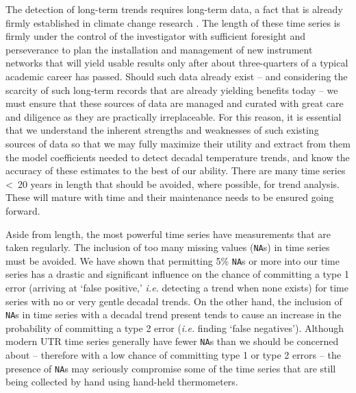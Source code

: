\documentclass[]{ametsoc}
\begin{document}
The detection of long-term trends requires long-term data, a fact that is already firmly established in climate change research \citep{Ohring2005, IPCC2013}. The length of these time series is firmly under the control of the investigator with sufficient foresight and perseverance to plan the installation and management of new instrument networks that will yield usable results only after about three-quarters of a typical academic career has passed. Should such data already exist -- and considering the scarcity of such long-term records that are already yielding benefits today -- we must ensure that these sources of data are managed and curated with great care and diligence as they are practically irreplaceable. For this reason, it is essential that we understand the inherent strengths and weaknesses of such existing sources of data so that we may fully maximize their utility and extract from them the model coefficients needed to detect decadal temperature trends, and know the accuracy of these estimates to the best of our ability. There are many time series \textless~20 years in length that should be avoided, where possible, for trend analysis. These will mature with time and their maintenance needs to be ensured going forward.

Aside from length, the most powerful time series have measurements that are taken regularly. The inclusion of too many missing values (\texttt{NA}s) in time series must be avoided. We have shown that permitting 5\% \texttt{NA}s or more into our time series has a drastic and significant influence on the chance of committing a type 1 error (arriving at `false positive,' \emph{i.e.} detecting a trend when none exists) for time series with no or very gentle decadal trends. On the other hand, the inclusion of \texttt{NA}s in time series with a decadal trend present tends to cause an increase in the probability of committing a type 2 error (\emph{i.e.} finding `false negatives'). Although modern UTR time series generally have fewer \texttt{NA}s than we should be concerned about -- therefore with a low chance of committing type 1 or type 2 errors -- the presence of \texttt{NA}s may seriously compromise some of the time series that are still being collected by hand using hand-held thermometers.
\end{document}
